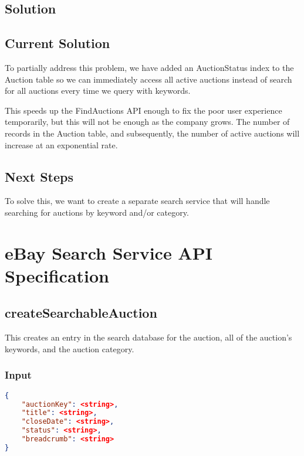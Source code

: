 \documentclass[12pt,a4paper]{article}
\begin{document}
\subsection{Solution}
\subsection{Current Solution}
\vspace{\baselineskip}
To partially address this problem, we have added an AuctionStatus index to the
Auction table so we can immediately access all active auctions instead of
search for all auctions every time we query with keywords. 

\vspace{\baselineskip}
This speeds up the FindAuctions API enough to fix the poor user experience
temporarily, but this will not be enough as the company grows. The number of
records in the Auction table, and subsequently, the number of active auctions
will increase at an exponential rate. 

\subsection{Next Steps}

To solve this, we want to create a separate search service that will handle
searching for auctions by keyword and/or category.



\section{eBay Search Service API Specification}

\subsection{createSearchableAuction}
This creates an entry in the search database for the auction, all of the
auction's keywords, and the auction category.

\subsubsection{Input}
\begin{lstlisting}[language=json,firstnumber=1]
{
    "auctionKey": <string>,
    "title": <string>,
    "closeDate": <string>,
    "status": <string>,
    "breadcrumb": <string>
}
\end{lstlisting}
\end{document}
